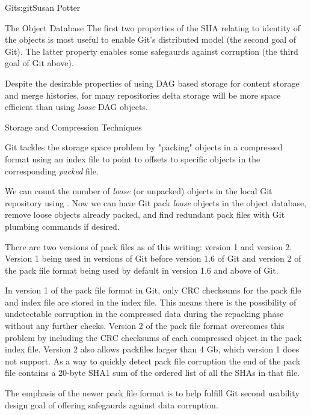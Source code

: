 \begin{aosachapter}{Git}{s:git}{Susan Potter}
\begin{aosasect1}{The Object Database}
The first two properties of the SHA relating to identity of the objects is
most useful to enable Git's distributed model (the second goal of Git).
The latter property enables some safegaurds against corruption (the third
goal of Git above).

Despite the desirable properties of using DAG based storage for content
storage and merge histories, for many repositories delta storage will be
more space efficient than using \emph{loose} DAG objects.

\end{aosasect1}

\begin{aosasect1}{Storage and Compression Techniques}

Git tackles the storage space problem by "packing" objects in a compressed
format using an index file to point to offsets to specific objects in the
corresponding \emph{packed} file.


We can count the number of \emph{loose} (or unpacked) objects in the local
Git repository using . Now we can have Git pack
\emph{loose} objects in the object database, remove loose objects already
packed, and find redundant pack files with Git plumbing commands if desired.

There are two versions of pack files as of this writing: version 1 and
version 2. Version 1 being used in versions of Git before version 1.6 of Git
and version 2 of the pack file format being used by default in version 1.6
and above of Git.

In version 1 of the pack file format in Git, only CRC checksums for
the pack file and index file are stored in the index file. This means there
is the possibility of undetectable corruption in the compressed data during
the repacking phase without any further checks. Version 2 of the pack file
format overcomes this problem by including the CRC checksums of each
compressed object in the pack index file. Version 2 also allows packfiles
larger than 4 Gb, which version 1 does not support. As a way to quickly
detect pack file corruption the end of the pack file contains a 20-byte SHA1
sum of the ordered list of all the SHAs in that file.

The emphasis of the newer pack file format is to help fulfill Git second
usability design goal of offering safegaurds against data corruption.


\end{aosasect1}
\end{aosachapter}
